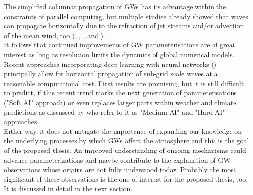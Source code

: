 The simplified columnar propagation of GWs has its advantage within the constraints of parallel computing, but multiple studies already showed that waves can propagate horizontally due to the refraction of jet streams and/or advection of the mean wind, too (\cite{dunkerton_inertiagravity_1984}, \cite{preusse_space-based_2002}, \cite{sato_origins_2009}, \cite{sato_gravity_2012} and \cite{ehard_horizontal_2017}). \\ %
It follows that continued improvements of GW parameterisations are of great interest as long as resolution limits the dynamics of global numerical models. Recent approaches incorporating deep learning with neural networks (\cite{matsuoka_application_2020}) principally allow for horizontal propagation of sub-grid scale waves at a reasonable computational cost. First results are promising, but it is still difficult to predict, if this recent trend marks the next generation of parameterisations ("Soft AI" approach) or even replaces larger parts within weather and climate predictions as discussed by \textcite{chantry_opportunities_2021} who refer to it as "Medium AI" and "Hard AI" approaches. \\
Either way, it does not mitigate the importance of expanding our knowledge on the underlying processes by which GWs affect the atmosphere and this is the goal of the proposed thesis. An improved understanding of ongoing mechanisms could advance parameterizations and maybe contribute to the explanation of GW observations whose origins are not fully understood today. Probably the most significant of these observations is the one of interest for the proposed thesis, too. It is discussed in detail in the next section.





